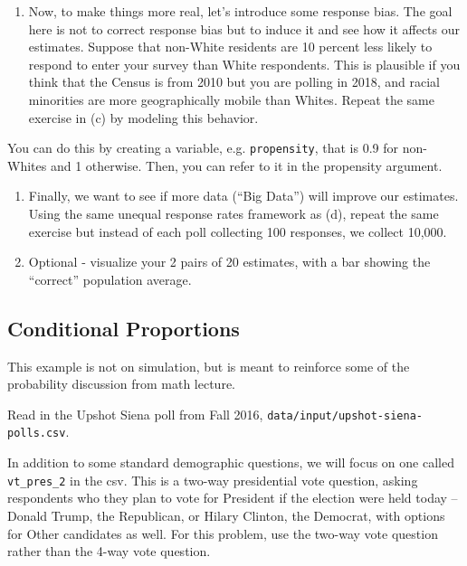 \documentclass[]{book}
\providecommand{\tightlist}{%
  \setlength{\itemsep}{0pt}\setlength{\parskip}{0pt}}
\theoremstyle{definition}
\theoremstyle{definition}
\theoremstyle{definition}
\theoremstyle{remark}
\begin{document}
\begin{enumerate}
\def\labelenumi{(\alph{enumi})}
\setcounter{enumi}{3}
\tightlist
\item
  Now, to make things more real, let's introduce some response bias. The
  goal here is not to correct response bias but to induce it and see how
  it affects our estimates. Suppose that non-White residents are 10
  percent less likely to respond to enter your survey than White
  respondents. This is plausible if you think that the Census is from
  2010 but you are polling in 2018, and racial minorities are more
  geographically mobile than Whites. Repeat the same exercise in (c) by
  modeling this behavior.
\end{enumerate}

You can do this by creating a variable, e.g. \texttt{propensity}, that
is 0.9 for non-Whites and 1 otherwise. Then, you can refer to it in the
propensity argument.

\begin{enumerate}
\def\labelenumi{(\alph{enumi})}
\setcounter{enumi}{4}
\item
  Finally, we want to see if more data (``Big Data'') will improve our
  estimates. Using the same unequal response rates framework as (d),
  repeat the same exercise but instead of each poll collecting 100
  responses, we collect 10,000.
\item
  Optional - visualize your 2 pairs of 20 estimates, with a bar showing
  the ``correct'' population average.
\end{enumerate}

\subsection*{Conditional Proportions}\label{conditional-proportions}

This example is not on simulation, but is meant to reinforce some of the
probability discussion from math lecture.

Read in the Upshot Siena poll from Fall 2016,
\texttt{data/input/upshot-siena-polls.csv}.

In addition to some standard demographic questions, we will focus on one
called \texttt{vt\_pres\_2} in the csv. This is a two-way presidential
vote question, asking respondents who they plan to vote for President if
the election were held today -- Donald Trump, the Republican, or Hilary
Clinton, the Democrat, with options for Other candidates as well. For
this problem, use the two-way vote question rather than the 4-way vote
question.
\end{document}
